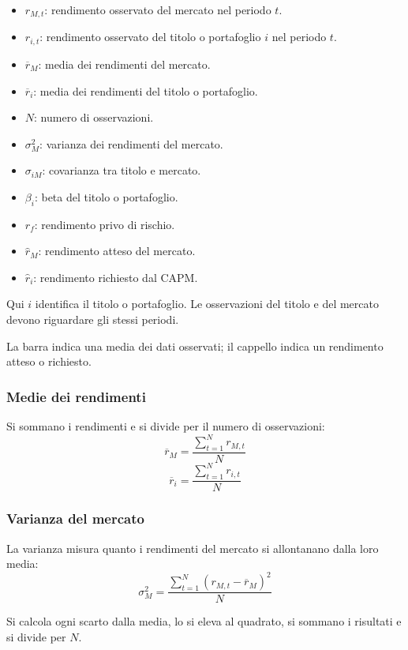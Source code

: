 \begin{itemize}
    \item $r_{M,t}$: rendimento osservato del mercato
        nel periodo $t$.
    \item $r_{i,t}$: rendimento osservato del titolo
        o portafoglio $i$ nel periodo $t$.
    \item $\overline r_M$: media dei rendimenti del mercato.
    \item $\overline r_i$: media dei rendimenti del titolo
        o portafoglio.
    \item $N$: numero di osservazioni.
    \item $\sigma_M^2$: varianza dei rendimenti del mercato.
    \item $\sigma_{iM}$: covarianza tra titolo e mercato.
    \item $\beta_i$: beta del titolo o portafoglio.
    \item $r_f$: rendimento privo di rischio.
    \item $\widehat r_M$: rendimento atteso del mercato.
    \item $\widehat r_i$: rendimento richiesto dal CAPM.
\end{itemize}

\noindent
Qui $i$ identifica il titolo o portafoglio.
Le osservazioni del titolo e del mercato devono riguardare
gli stessi periodi.

\noindent
La barra indica una media dei dati osservati;
il cappello indica un rendimento atteso o richiesto.

\subsubsection*{Medie dei rendimenti}

\noindent
Si sommano i rendimenti e si divide per il numero
di osservazioni:
\[
    \overline r_M
    =
    \frac{\sum_{t=1}^{N}r_{M,t}}{N}
\]
\[
    \overline r_i
    =
    \frac{\sum_{t=1}^{N}r_{i,t}}{N}
\]

\subsubsection*{Varianza del mercato}

\noindent
La varianza misura quanto i rendimenti del mercato
si allontanano dalla loro media:
\[
    \sigma_M^2
    =
    \frac{
        \sum_{t=1}^{N}(r_{M,t}-\overline r_M)^2
    }{N}
\]

\noindent
Si calcola ogni scarto dalla media, lo si eleva al quadrato,
si sommano i risultati e si divide per $N$.

